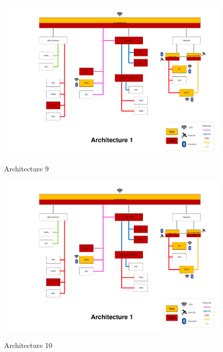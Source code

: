 \begin{figure}[h]
    \centering
    \caption{Architecture 9}
    \includegraphics[width=\textwidth, page=9]{../Architectures-survey.pdf}
    \label{fig:architecture9}
\end{figure}

\begin{figure}[h]
    \centering
    \caption{Architecture 10}
    \includegraphics[width=\textwidth, page=10]{../Architectures-survey.pdf}
    \label{fig:architecture10}
\end{figure}
